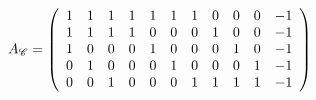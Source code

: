 \[
A_{\mathscr{C}} = 
 \left(\begin{array}{rrrrrrrrrrr}
1 & 1 & 1 & 1 & 1 & 1 & 1 & 0 & 0 & 0 & -1 \\
1 & 1 & 1 & 1 & 0 & 0 & 0 & 1 & 0 & 0 & -1 \\
1 & 0 & 0 & 0 & 1 & 0 & 0 & 0 & 1 & 0 & -1 \\
0 & 1 & 0 & 0 & 0 & 1 & 0 & 0 & 0 & 1 & -1 \\
0 & 0 & 1 & 0 & 0 & 0 & 1 & 1 & 1 & 1 & -1 
\end{array}\right) 
\]
